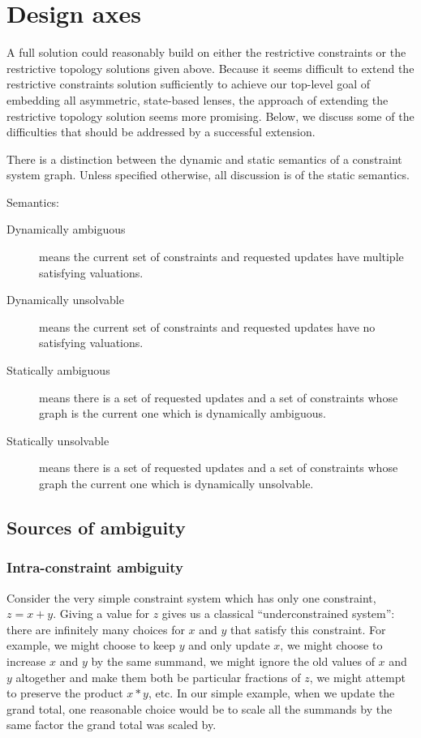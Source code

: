 \section{Design axes}
\label{sec:design_axes}
A full solution could reasonably build on either the restrictive constraints
or the restrictive topology solutions given above. Because it seems
difficult to extend the restrictive constraints solution sufficiently to
achieve our top-level goal of embedding all asymmetric, state-based lenses,
the approach of extending the restrictive topology solution seems more
promising. Below, we discuss some of the difficulties that should be addressed
by a successful extension.

There is a distinction between the dynamic and static semantics of a
constraint system graph. Unless specified otherwise, all discussion is of
the static semantics.
\begin{definition} Semantics:
    \begin{description}
        \item[Dynamically ambiguous] means the current set of constraints and
            requested updates have multiple satisfying valuations.
        \item[Dynamically unsolvable] means the current set of constraints and
            requested updates have no satisfying valuations.
        \item[Statically ambiguous] means there is a set of requested updates
            and a set of constraints whose graph is the current one which is
            dynamically ambiguous.
        \item[Statically unsolvable] means there is a set of requested updates
            and a set of constraints whose graph the current one which is
            dynamically unsolvable.
    \end{description}
\end{definition}

\subsection{Sources of ambiguity}
\subsubsection{Intra-constraint ambiguity}
Consider the very simple constraint system which has only one constraint, $z
= x+y$. Giving a value for $z$ gives us a classical ``underconstrained
system'': there are infinitely many choices for $x$ and $y$ that satisfy
this constraint. For example, we might choose to keep $y$ and only update
$x$, we might choose to increase $x$ and $y$ by the same summand, we might
ignore the old values of $x$ and $y$ altogether and make them both be
particular fractions of $z$, we might attempt to preserve the product $x*y$,
etc. In our simple example, when we update the grand total, one reasonable
choice would be to scale all the summands by the same factor the grand total
was scaled by.

